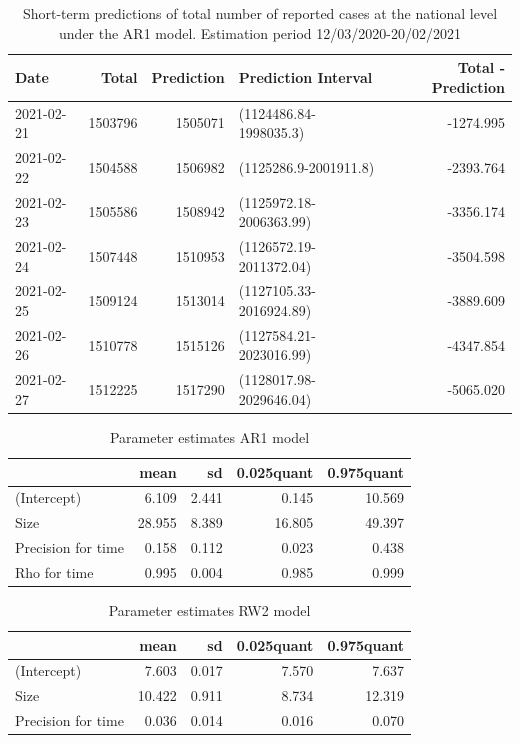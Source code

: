 \documentclass[10pt,letterpaper]{article}
\begin{document}
\begin{table}[!h]

\caption{\label{tab:unnamed-chunk-10}Short-term predictions of total number of reported cases at the national level under the AR1 model. Estimation period 12/03/2020-20/02/2021}
\centering
\begin{tabular}[t]{l|r|r|l|r}
\hline
Date & Total & Prediction & Prediction Interval & Total - Prediction\\
\hline
2021-02-21 & 1503796 & 1505071 & (1124486.84-1998035.3) & -1274.995\\
\hline
2021-02-22 & 1504588 & 1506982 & (1125286.9-2001911.8) & -2393.764\\
\hline
2021-02-23 & 1505586 & 1508942 & (1125972.18-2006363.99) & -3356.174\\
\hline
2021-02-24 & 1507448 & 1510953 & (1126572.19-2011372.04) & -3504.598\\
\hline
2021-02-25 & 1509124 & 1513014 & (1127105.33-2016924.89) & -3889.609\\
\hline
2021-02-26 & 1510778 & 1515126 & (1127584.21-2023016.99) & -4347.854\\
\hline
2021-02-27 & 1512225 & 1517290 & (1128017.98-2029646.04) & -5065.020\\
\hline
\end{tabular}
\end{table}

\begin{table}[!h]

\caption{\label{tab:unnamed-chunk-11}Parameter estimates AR1 model}
\centering
\begin{tabular}[t]{l|r|r|r|r}
\hline
  & mean & sd & 0.025quant & 0.975quant\\
\hline
(Intercept) & 6.109 & 2.441 & 0.145 & 10.569\\
\hline
Size & 28.955 & 8.389 & 16.805 & 49.397\\
\hline
Precision for time & 0.158 & 0.112 & 0.023 & 0.438\\
\hline
Rho for time & 0.995 & 0.004 & 0.985 & 0.999\\
\hline
\end{tabular}
\end{table}

\begin{table}[!h]

\caption{\label{tab:unnamed-chunk-11}Parameter estimates RW2 model}
\centering
\begin{tabular}[t]{l|r|r|r|r}
\hline
  & mean & sd & 0.025quant & 0.975quant\\
\hline
(Intercept) & 7.603 & 0.017 & 7.570 & 7.637\\
\hline
Size & 10.422 & 0.911 & 8.734 & 12.319\\
\hline
Precision for time & 0.036 & 0.014 & 0.016 & 0.070\\
\hline
\end{tabular}
\end{table}
\end{document}
